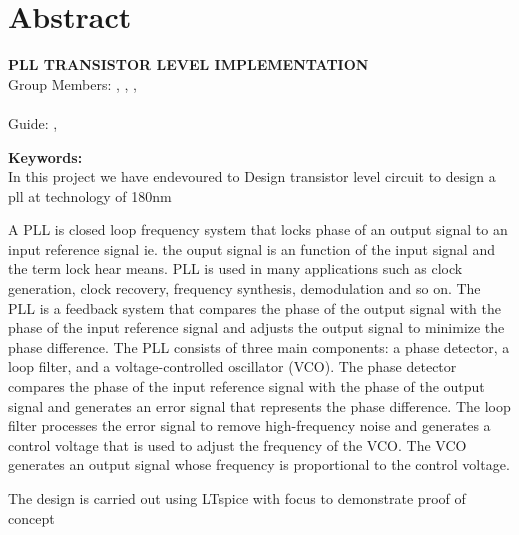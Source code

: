 \chapter*{Abstract}

\begin{center}
	\vspace{5mm}
	\MakeUppercase{\textbf{PLL Transistor Level Implementation}}\\
	\vspace{5mm}
	Group Members: \memberA, \memberB, \memberC, \\ \memberD \\
	\vspace{5mm}
	Guide: \guideA, \guideB \\
	\vspace{5mm}
\end{center}

\noindent \textbf{Keywords:} \\

In this project we have endevoured to Design transistor level circuit to design a pll at technology of 180nm 

A PLL is closed loop frequency system that locks phase of an output signal to an input reference signal ie. the ouput signal is an function of the input signal and the term lock hear means. 
PLL is used in many applications such as clock generation, clock recovery, frequency synthesis, demodulation and so on. The PLL is a feedback system that compares the phase of the output signal with the phase of the input reference signal and adjusts the output signal to minimize the phase difference. The PLL consists of three main components: a phase detector, a loop filter, and a voltage-controlled oscillator (VCO). The phase detector compares the phase of the input reference signal with the phase of the output signal and generates an error signal that represents the phase difference. The loop filter processes the error signal to remove high-frequency noise and generates a control voltage that is used to adjust the frequency of the VCO. The VCO generates an output signal whose frequency is proportional to the control voltage.

The design is carried out using LTspice with focus to demonstrate proof of concept 